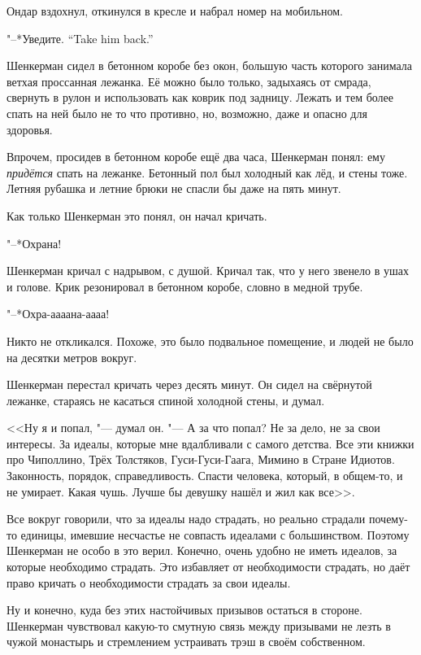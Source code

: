 Ондар вздохнул, откинулся в кресле и набрал номер на мобильном.

{"--*Уведите.}
{``Take him back.''}

\asterism

Шенкерман сидел в бетонном коробе без окон, большую часть которого занимала ветхая проссанная лежанка.
Её можно было только, задыхаясь от смрада, свернуть в рулон и использовать как коврик под задницу.
Лежать и тем более спать на ней было не то что противно, но, возможно, даже и опасно для здоровья.

Впрочем, просидев в бетонном коробе ещё два часа, Шенкерман понял: ему \textit{придётся} спать на лежанке.
Бетонный пол был холодный как лёд, и стены тоже.
Летняя рубашка и летние брюки не спасли бы даже на пять минут.

Как только Шенкерман это понял, он начал кричать.

"--*Охрана!

Шенкерман кричал с надрывом, с душой.
Кричал так, что у него звенело в ушах и голове.
Крик резонировал в бетонном коробе, словно в медной трубе.

"--*Охра-аааана-аааа!

Никто не откликался.
Похоже, это было подвальное помещение, и людей не было на десятки метров вокруг.

Шенкерман перестал кричать через десять минут.
Он сидел на свёрнутой лежанке, стараясь не касаться спиной холодной стены, и думал.

<<Ну я и попал, "--- думал он.
"--- А за что попал?
Не за дело, не за свои интересы.
За идеалы, которые мне вдалбливали с самого детства.
Все эти книжки про Чиполлино, Трёх Толстяков, Гуси-Гуси-Гаага, Мимино в Стране Идиотов.
Законность, порядок, справедливость.
Спасти человека, который, в общем-то, и не умирает.
Какая чушь.
Лучше бы девушку нашёл и жил как все>>.

Все вокруг говорили, что за идеалы надо страдать, но реально страдали почему-то единицы, имевшие несчастье не совпасть идеалами с большинством.
Поэтому Шенкерман не особо в это верил.
Конечно, очень удобно не иметь идеалов, за которые необходимо страдать.
Это избавляет от необходимости страдать, но даёт право кричать о необходимости страдать за свои идеалы.

Ну и конечно, куда без этих настойчивых призывов остаться в стороне.
Шенкерман чувствовал какую-то смутную связь между призывами не лезть в чужой монастырь и стремлением устраивать трэш в своём собственном.

